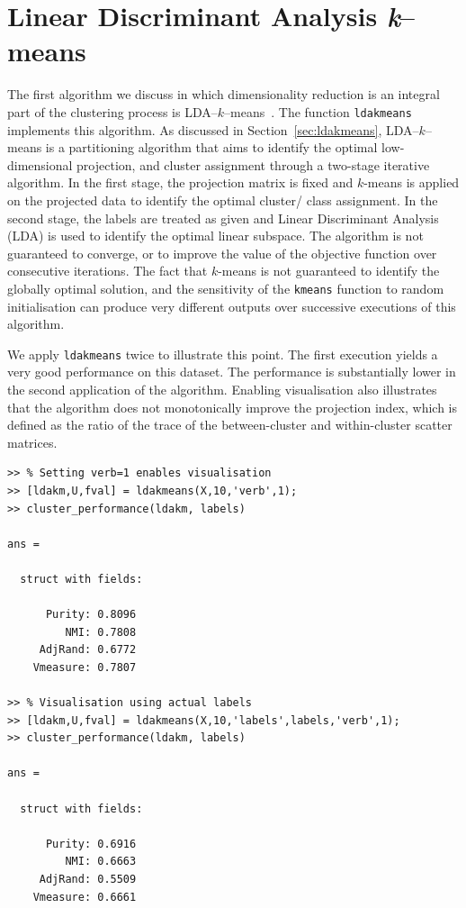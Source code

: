 \documentclass{book}
\begin{document}
\section{Linear Discriminant Analysis {\it k}--means}

The first algorithm we discuss in which dimensionality reduction is an
integral part of the clustering process is LDA--$k$--means~\cite{DingL2007}.
%
The function {\tt ldakmeans} implements this algorithm.
%
As discussed in Section~\ref{sec:ldakmeans}, LDA--$k$--means is a 
partitioning algorithm that aims to identify the optimal low-dimensional
projection, and cluster assignment through a two-stage
iterative algorithm. In the first stage, the projection matrix is fixed and
$k$-means is applied on the projected data to identify the optimal
cluster/ class assignment. In the second stage, the labels are treated as given
and Linear Discriminant Analysis (LDA) is used to identify the optimal linear
subspace.
%
The algorithm is not guaranteed to converge, or to improve the value of the
objective function over consecutive iterations. The fact that
$k$-means is not guaranteed to identify the globally optimal
solution, and the sensitivity of the 
{\tt kmeans} function to random initialisation can produce very different
outputs over successive executions of this algorithm.

We apply {\tt ldakmeans} twice to illustrate this point. The first execution yields a very good
performance on this dataset. The performance is substantially lower
in the second application of the algorithm. Enabling visualisation also
illustrates that the algorithm does not monotonically improve the
projection index, which is defined as the
ratio of the trace of the between-cluster and within-cluster scatter matrices.
%

\begin{verbatim}
>> % Setting verb=1 enables visualisation
>> [ldakm,U,fval] = ldakmeans(X,10,'verb',1);
>> cluster_performance(ldakm, labels)

ans = 

  struct with fields:

      Purity: 0.8096
         NMI: 0.7808
     AdjRand: 0.6772
    Vmeasure: 0.7807

>> % Visualisation using actual labels
>> [ldakm,U,fval] = ldakmeans(X,10,'labels',labels,'verb',1);
>> cluster_performance(ldakm, labels)

ans = 

  struct with fields:

      Purity: 0.6916
         NMI: 0.6663
     AdjRand: 0.5509
    Vmeasure: 0.6661

\end{verbatim}
\end{document}
